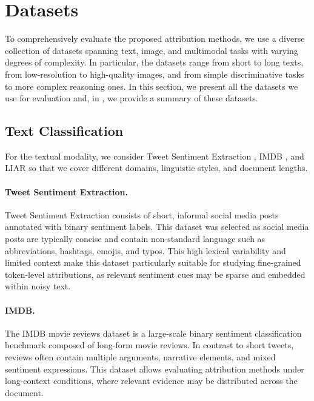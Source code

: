 \section{Datasets}

To comprehensively evaluate the proposed attribution methods, we use a diverse collection of datasets spanning text, image, and multimodal tasks with varying degrees of complexity. In particular, the datasets range from short to long texts, from low-resolution to high-quality images, and from simple discriminative tasks to more complex reasoning ones. In this section, we present all the datasets we use for evaluation and, in , we provide a summary of these datasets.



\subsection{Text Classification}

For the textual modality, we consider Tweet Sentiment Extraction \cite{tweet_sentiment,mteb}, IMDB \cite{imdb}, and LIAR \cite{politifact} so that we cover different domains, linguistic styles, and document lengths. 

\paragraph{Tweet Sentiment Extraction.}
Tweet Sentiment Extraction \cite{tweet_sentiment,mteb} consists of short, informal social media posts annotated with binary sentiment labels. This dataset was selected as social media posts are typically concise and contain non-standard language such as abbreviations, hashtags, emojis, and typos. This high lexical variability and limited context make this dataset particularly suitable for studying fine-grained token-level attributions, as relevant sentiment cues may be sparse and embedded within noisy text.

\paragraph{IMDB.}
The IMDB movie reviews dataset \cite{imdb} is a large-scale binary sentiment classification benchmark composed of long-form movie reviews. In contrast to short tweets, reviews often contain multiple arguments, narrative elements, and mixed sentiment expressions. This dataset allows evaluating attribution methods under long-context conditions, where relevant evidence may be distributed across the document. 


